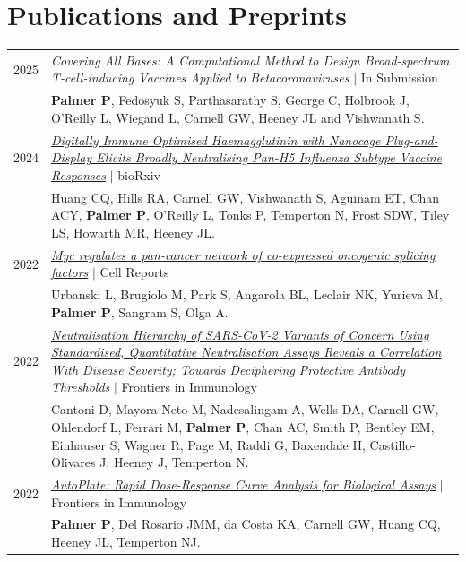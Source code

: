\documentclass[letterpaper,11pt]{article}
\begin{document}
\section{\textbf{Publications and Preprints}}
\begin{tabularx}{\linewidth}{@{}p{2cm}@{\hspace{5pt}}|@{\hspace{5pt}}X@{}}
    2025 & 
    \textit{Covering All Bases: A Computational Method to Design Broad-spectrum T-cell-inducing Vaccines Applied to Betacoronaviruses} $|$ In Submission \\
    & \textbf{Palmer P}, Fedosyuk S, Parthasarathy S, George C, Holbrook J, O'Reilly L, Wiegand L, Carnell GW, Heeney JL and Vishwanath S. \\
    2024 & 
    \textit{\href{https://www.biorxiv.org/content/10.1101/2024.11.14.623359v1.abstract}{\color{teal}Digitally Immune Optimised Haemagglutinin with Nanocage Plug-and-Display Elicits Broadly Neutralising Pan-H5 Influenza Subtype Vaccine Responses}} $|$ bioRxiv \\
    & Huang CQ, Hills RA, Carnell GW, Vishwanath S, Aguinam ET, Chan ACY, \textbf{Palmer P}, O'Reilly L, Tonks P, Temperton N, Frost SDW, Tiley LS, Howarth MR, Heeney JL. \\
    2022 & 
    \textit{\href{https://doi.org/10.1016/j.celrep.2022.111704}{\color{teal}Myc regulates a pan-cancer network of co-expressed oncogenic splicing factors}} $|$ Cell Reports \\
    & Urbanski L, Brugiolo M, Park S, Angarola BL, Leclair NK, Yurieva M, \textbf{Palmer P}, Sangram S, Olga A. \\
    
    2022 & 
    \textit{\href{https://doi.org/10.3389/fimmu.2022.773982}{\color{teal}Neutralisation Hierarchy of SARS-CoV-2 Variants of Concern Using Standardised, Quantitative Neutralisation Assays Reveals a Correlation With Disease Severity; Towards Deciphering Protective Antibody Thresholds}} $|$ Frontiers in Immunology \\
    & Cantoni D, Mayora-Neto M, Nadesalingam A, Wells DA, Carnell GW, Ohlendorf L, Ferrari M, \textbf{Palmer P}, Chan AC, Smith P, Bentley EM, Einhauser S, Wagner R, Page M, Raddi G, Baxendale H, Castillo-Olivares J, Heeney J, Temperton N. \\
    
    2022 & 
    \textit{\href{https://doi.org/10.3389/fimmu.2021.681636}{\color{teal}AutoPlate: Rapid Dose-Response Curve Analysis for Biological Assays}} $|$ Frontiers in Immunology \\
    & \textbf{Palmer P}, Del Rosario JMM, da Costa KA, Carnell GW, Huang CQ, Heeney JL, Temperton NJ. \\
    

\end{tabularx}
\end{document}
